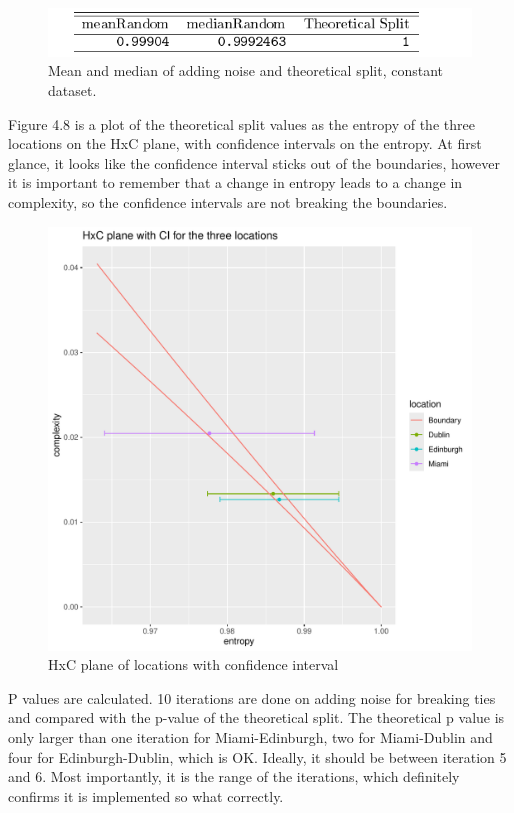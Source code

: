 \begin{figure}
    \centering
    \includegraphics[width=\textwidth,keepaspectratio]{./Weather/random_vs_theoreticalSplitWhiteNoise.pdf}
    \caption{Mean and median of adding noise and theoretical split, constant dataset.}
\end{figure}

Figure 4.8 is a plot of the theoretical split values as the entropy of the three locations on the HxC plane, with confidence intervals on the entropy. At first glance, it looks like the confidence interval sticks out of the boundaries, however it is important to remember that a change in entropy leads to a change in complexity, so the confidence intervals are not breaking the boundaries. 

\begin{figure}
    \centering
    \includegraphics[width=\textwidth,keepaspectratio]{./Weather/confidenceIntervalPlot.pdf}
    \caption{HxC plane of locations with confidence interval}
\end{figure}

P values are calculated. 10 iterations are done on adding noise for breaking ties and compared with the p-value of the theoretical split. The theoretical p value is only larger than one iteration for Miami-Edinburgh, two for Miami-Dublin and four for Edinburgh-Dublin, which is OK. Ideally, it should be between iteration 5 and 6. Most importantly, it is the range of the iterations, which definitely confirms it is implemented so what correctly. 


